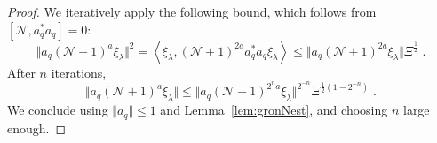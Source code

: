 \documentclass[12pt,a4paper]{article}
\numberwithin{equation}{section}
\newcommand{\cN}{\mathcal{N}}
\newcommand{\1}{\mathbb{I}}
\newcommand{\half}{\frac{1}{2}}
\newcommand{\eva}[1]{\left\langle #1 \right\rangle}
\theoremstyle{plain}
\theoremstyle{definition}
\theoremstyle{remark}
\theoremstyle{plain}
\theoremstyle{definition}
\theoremstyle{remark}
\begin{document}
\begin{proof}
We iteratively apply the following bound, which follows from $ [\cN, a_q^* a_q] = 0 $:
\begin{equation}
	\Vert a_q (\cN + 1)^a \xi_\lambda \Vert^2
	= \eva{\xi_\lambda, (\cN + 1)^{2a} a_q^* a_q \xi_\lambda}
	\le \Vert a_q (\cN + 1)^{2a} \xi_\lambda \Vert \Xi^{\frac 12} \;.
\end{equation}
After $ n $ iterations,
\begin{equation}
	\Vert a_q (\cN + 1)^a \xi_\lambda \Vert
	\le \Vert a_q (\cN + 1)^{2^n a} \xi_\lambda \Vert^{2^{-n}} \Xi^{\half (1-2^{-n})} \;.
\end{equation}
We conclude using $ \Vert a_q \Vert \le 1 $ and Lemma~\ref{lem:gronNest}, and choosing $ n $ large enough.
\end{proof}
\end{document}
